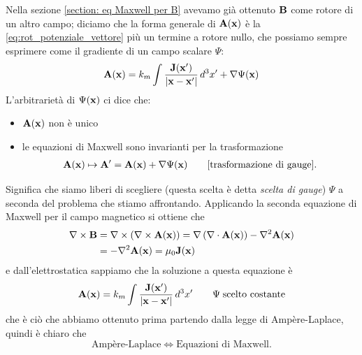 Nella sezione \ref{section: eq Maxwell per B} avevamo già ottenuto $ \mathbf{ B } $ come rotore di un altro campo; 
diciamo che la forma generale di $ \mathbf{ A(x) } $ è la \eqref{eq:rot_potenziale_vettore} più un termine a rotore nullo, che possiamo sempre esprimere 
come il gradiente di un campo scalare $ \Psi $:
\begin{equation}
  \mathbf{ A(x) } = k_m \int \frac{\mathbf{ J(x') }}{\mathbf{ |x-x'| }} \,d^3x' + \nabla \Psi (\mathbf{ x })
\end{equation}
L'arbitrarietà di $ \Psi(\mathbf{ x }) $ ci dice che:
\begin{itemize}
  \item $ \mathbf{ A(x) } $ non è unico
  \item le equazioni di Maxwell sono invarianti per la trasformazione 
  \begin{align}
    \mathbf{ A(x) } \mapsto \mathbf{ A }' = \mathbf{ A(x) } + \nabla \Psi \mathbf{ (x) } \tag*{[trasformazione di gauge]}.
  \end{align}
\end{itemize}
Significa che siamo liberi di scegliere (questa scelta è detta \textit{scelta di gauge}) $ \Psi $ a seconda del problema che stiamo affrontando.
Applicando la seconda equazione di Maxwell per il campo magnetico si ottiene che
\begin{align}
  \mathbf{\nabla}\times\mathbf{ B } &= \mathbf{\nabla}\times\mathbf{ \left( \mathbf{\nabla}\times\mathbf{ A(x) } \right) } 
  = \nabla \left( \nabla \cdot \mathbf{ A(x) } \right) - \nabla^2\mathbf{ A(x) } \\
  &= - \nabla^2 \mathbf{ A(x) } = \mu_0 \mathbf{ J(x) }
\end{align}
e dall'elettrostatica sappiamo che la soluzione a questa equazione è
\begin{equation}
  \mathbf{ A(x) } = k_m \int \frac{\mathbf{ J(x') }}{\mathbf{ |x-x'| }} \,d^3x' \qquad \Psi \; \text{scelto costante}
\end{equation}
che è ciò che abbiamo ottenuto prima partendo dalla legge di Ampère-Laplace, quindi è chiaro che
\begin{equation}
  \text{Ampère-Laplace} \iff \text{Equazioni di Maxwell}.
\end{equation}
